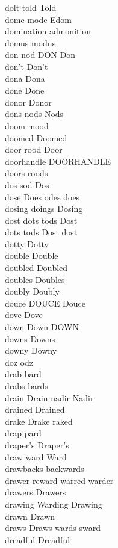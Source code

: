 dolt told Told\\
dome mode Edom\\
domination admonition\\
domus modus\\
don nod DON Don\\
don't Don't\\
dona Dona\\
done Done\\
donor Donor\\
dons nods Nods\\
doom mood\\
doomed Doomed\\
door rood Door\\
doorhandle DOORHANDLE\\
doors roods\\
dos sod Dos\\
dose Does odes does\\
dosing doings Dosing\\
dost dots tods Dost\\
dots tods Dost dost\\
dotty Dotty\\
double Double\\
doubled Doubled\\
doubles Doubles\\
doubly Doubly\\
douce DOUCE Douce\\
dove Dove\\
down Down DOWN\\
downs Downs\\
downy Downy\\
doz odz\\
drab bard\\
drabs bards\\
drain Drain nadir Nadir\\
drained Drained\\
drake Drake raked\\
drap pard\\
draper's Draper's\\
draw ward Ward\\
drawbacks backwards\\
drawer reward warred warder\\
drawers Drawers\\
drawing Warding Drawing\\
drawn Drawn\\
draws Draws wards sward\\
dreadful Dreadful\\
